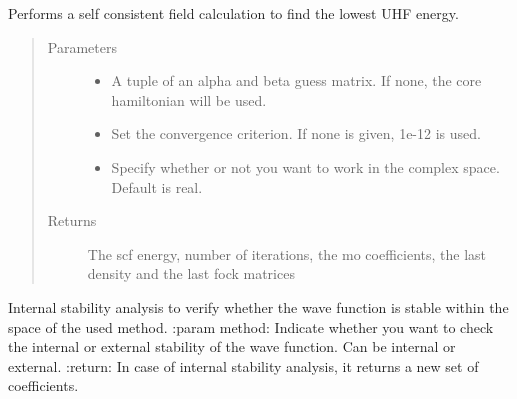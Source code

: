 \documentclass[letterpaper,10pt,english]{sphinxmanual}
\begin{document}
\begin{fulllineitems}

\begin{fulllineitems}
\label{\detokenize{UHF:hf.HartreeFock.UHF.MF.scf}}
Performs a self consistent field calculation to find the lowest UHF energy.
\begin{quote}\begin{description}
\item[{Parameters}] \leavevmode\begin{itemize}
\item {} 
 \textendash{} A tuple of an alpha and beta guess matrix. If none, the core hamiltonian will be used.

\item {} 
 \textendash{} Set the convergence criterion. If none is given, 1e-12 is used.

\item {} 
 \textendash{} Specify whether or not you want to work in the complex space. Default is real.

\end{itemize}

\item[{Returns}] \leavevmode
The scf energy, number of iterations, the mo coefficients, the last density and the last fock matrices

\end{description}\end{quote}

\end{fulllineitems}


\begin{fulllineitems}
\label{\detokenize{UHF:hf.HartreeFock.UHF.MF.stability_analysis}}
Internal stability analysis to verify whether the wave function is stable within the space of the used method.
:param method: Indicate whether you want to check the internal or external stability of the wave function. Can
be internal or external.
:return: In case of internal stability analysis, it returns a new set of coefficients.

\end{fulllineitems}


\end{fulllineitems}
\end{document}
